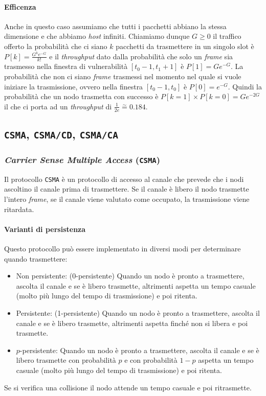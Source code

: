             \paragraph{Efficenza} Anche in questo caso assumiamo che tutti i pacchetti abbiano la stessa dimensione e che abbiamo \textit{host} infiniti. Chiamiamo dunque $G\geq 0$ il traffico offerto la probabilità che ci siano $k$ pacchetti da trasmettere in un singolo slot è $P[k]=\frac{G^ke^{-G}}{k!}$ e il \textit{throughput} dato dalla probabilità che solo un \textit{frame} sia trasmesso nella finestra di vulnerabilità $[t_0-1,t_1+1]$ è $P[1]=Ge^{-G}$. La probabilità che non ci siano \textit{frame} trasmessi nel momento nel quale si vuole iniziare la trasmissione, ovvero nella finestra $[t_0-1,t_0]$ è $P[0]=e^{-G}$. Quindi la probabilità che un nodo trasmetta con successo è $P[k=1]\times P[k=0]=Ge^{-2G}$ il che ci porta ad un \textit{throughput} di $\frac{1}{2e}\stackrel{\sim}{=}0.184$.
    \subsection{\texttt{CSMA}, \texttt{CSMA/CD}, \texttt{CSMA/CA}}
        \subsubsection{\textit{Carrier Sense Multiple Access} (\texttt{CSMA})}
            Il protocollo \texttt{CSMA} è un protocollo di accesso al canale che prevede che i nodi ascoltino il canale prima di trasmettere. Se il canale è libero il nodo trasmette l'intero \textit{frame}, se il canale viene valutato come occupato, la trasmissione viene ritardata.
            \paragraph{Varianti di persistenza} Questo protocollo può essere implementato in diversi modi per determinare quando trasmettere:
            \begin{itemize}
                \item Non persistente: (0-persistente) Quando un nodo è pronto a trasmettere, ascolta il canale e se è libero trasmette, altrimenti aspetta un tempo casuale (molto più lungo del tempo di trasmissione) e poi ritenta.
                \item Persistente: (1-persistente) Quando un nodo è pronto a trasmettere, ascolta il canale e se è libero trasmette, altrimenti aspetta finché non si libera e poi trasmette.
                \item $p$-persistente: Quando un nodo è pronto a trasmettere, ascolta il canale e se è libero trasmette con probabilità $p$ e con probabilità $1-p$ aspetta un tempo casuale (molto più lungo del tempo di trasmissione) e poi ritenta.
            \end{itemize}
            Se si verifica una collisione il nodo attende un tempo casuale e poi ritrasmette.
